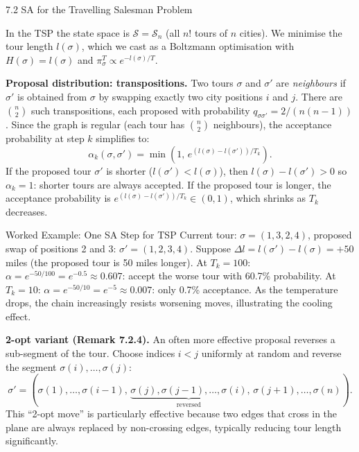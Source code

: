 \documentclass[aspectratio=169,10pt]{beamer}
\newcommand{\calS}{\mathcal{S}}
\begin{document}
\begin{frame}[allowframebreaks]{7.2 SA for the Travelling Salesman Problem}

In the TSP the state space is $\calS = \mathcal{S}_n$ (all $n!$ tours of
$n$ cities).  We minimise the tour length $l(\sigma)$, which we cast as a
Boltzmann optimisation with $H(\sigma) = l(\sigma)$ and
$\pi^T_\sigma \propto e^{-l(\sigma)/T}$.

\medskip
\textbf{Proposal distribution: transpositions.}
Two tours $\sigma$ and $\sigma'$ are \emph{neighbours} if $\sigma'$ is
obtained from $\sigma$ by swapping exactly two city positions $i$ and $j$.
There are $\binom{n}{2}$ such transpositions, each proposed with
probability $q_{\sigma\sigma'} = 2/(n(n-1))$.  Since the graph is regular
(each tour has $\binom{n}{2}$ neighbours), the acceptance probability at
step $k$ simplifies to:
\[
  \alpha_k(\sigma,\sigma') = \min\!\left(1,\,e^{(l(\sigma)-l(\sigma'))/T_k}\right).
\]
If the proposed tour $\sigma'$ is shorter ($l(\sigma') < l(\sigma)$), then
$l(\sigma) - l(\sigma') > 0$ so $\alpha_k = 1$: shorter tours are always
accepted.  If the proposed tour is longer, the acceptance probability is
$e^{(l(\sigma)-l(\sigma'))/T_k} \in (0,1)$, which shrinks as $T_k$
decreases.

\begin{exampleblock}{Worked Example: One SA Step for TSP}
  Current tour: $\sigma = (1, 3, 2, 4)$, proposed swap of positions 2 and
  3: $\sigma' = (1, 2, 3, 4)$.  Suppose $\Delta l = l(\sigma') - l(\sigma)
  = +50$ miles (the proposed tour is 50 miles longer).  At $T_k = 100$:
  $\alpha = e^{-50/100} = e^{-0.5} \approx 0.607$: accept the worse tour
  with 60.7\% probability.  At $T_k = 10$: $\alpha = e^{-50/10} = e^{-5}
  \approx 0.007$: only 0.7\% acceptance.  As the temperature drops, the
  chain increasingly resists worsening moves, illustrating the cooling
  effect.
\end{exampleblock}

\textbf{2-opt variant (Remark 7.2.4).}
An often more effective proposal reverses a sub-segment of the tour.  Choose
indices $i < j$ uniformly at random and reverse the segment
$\sigma(i), \ldots, \sigma(j)$:
\[
  \sigma' = (\sigma(1),\ldots,\sigma(i-1),\,
            \underbrace{\sigma(j),\sigma(j-1),\ldots,\sigma(i)}_{\text{reversed}},\,
            \sigma(j+1),\ldots,\sigma(n)).
\]
This ``2-opt move'' is particularly effective because two edges that cross
in the plane are always replaced by non-crossing edges, typically reducing
tour length significantly.


\end{frame}
\end{document}
